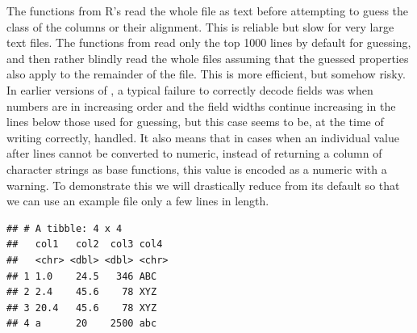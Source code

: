 \documentclass[krantz2]{krantz}\usepackage{knitr}
\begin{document}
\begin{explainbox}
The functions from R's  read the whole file as text before attempting to guess the class of the columns or their alignment. This is reliable but slow for very large text files. The functions from  read only the top 1000 lines by default for guessing, and then rather blindly read the whole files assuming that the guessed properties also apply to the remainder of the file. This is more efficient, but somehow risky. In earlier versions of , a typical failure to correctly decode fields was when numbers are in increasing order and the field widths continue increasing in the lines below those used for guessing, but this case seems to be, at the time of writing correctly, handled. It also means that in cases when an individual value after  lines cannot be converted to numeric, instead of returning a column of character strings as base \Rpgrm functions, this value is encoded as a numeric  with a warning. To demonstrate this we will drastically reduce  from its default so that we can use an example file only a few lines in length.



\begin{knitrout}\footnotesize
{}\color{fgcolor}\begin{kframe}
\begin{alltt}
\hlstd{(} \hlstd{=} \hlstd{)}
\end{alltt}


{\ttfamily\noindent\color{warningcolor}{\#\# Warning: `read\_table2()` was deprecated in readr 2.0.0.\\\#\# Please use `read\_table()` instead.}}

{\ttfamily\noindent\itshape\color{messagecolor}{\#\# \\\#\# -- Column specification --------------------------------------------------------\\\#\# cols(\\\#\# \ \ col1 = col\_character(),\\\#\# \ \ col2 = col\_double(),\\\#\# \ \ col3 = col\_double(),\\\#\# \ \ col4 = col\_character()\\\#\# )}}\begin{verbatim}
## # A tibble: 4 x 4
##   col1   col2  col3 col4 
##   <chr> <dbl> <dbl> <chr>
## 1 1.0    24.5   346 ABC  
## 2 2.4    45.6    78 XYZ  
## 3 20.4   45.6    78 XYZ  
## 4 a      20    2500 abc
\end{verbatim}
\end{kframe}
\end{knitrout}


\end{explainbox}
\end{document}
